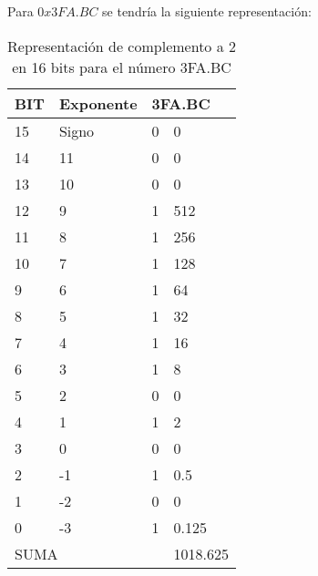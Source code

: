 \documentclass[stu, 12pt, letterpaper, donotrepeattitle, floatsintext, natbib]{apa7}
\begin{document}
Para $0x3FA.BC$ se tendría la siguiente representación:
\begin{table}[]
\caption{Representación de complemento a 2 en 16 bits para el número 3FA.BC}
\begin{tabular}{|llll|}
\hline
\multicolumn{1}{|l|}{BIT} & \multicolumn{1}{l|}{Exponente} & \multicolumn{2}{l|}{3FA.BC}       \\ \hline
\multicolumn{1}{|l|}{15}  & \multicolumn{1}{l|}{Signo}     & \multicolumn{1}{l|}{0} & 0        \\ \hline
\multicolumn{1}{|l|}{14}  & \multicolumn{1}{l|}{11}        & \multicolumn{1}{l|}{0} & 0        \\ \hline
\multicolumn{1}{|l|}{13}  & \multicolumn{1}{l|}{10}        & \multicolumn{1}{l|}{0} & 0        \\ \hline
\multicolumn{1}{|l|}{12}  & \multicolumn{1}{l|}{9}         & \multicolumn{1}{l|}{1} & 512      \\ \hline
\multicolumn{1}{|l|}{11}  & \multicolumn{1}{l|}{8}         & \multicolumn{1}{l|}{1} & 256      \\ \hline
\multicolumn{1}{|l|}{10}  & \multicolumn{1}{l|}{7}         & \multicolumn{1}{l|}{1} & 128      \\ \hline
\multicolumn{1}{|l|}{9}   & \multicolumn{1}{l|}{6}         & \multicolumn{1}{l|}{1} & 64       \\ \hline
\multicolumn{1}{|l|}{8}   & \multicolumn{1}{l|}{5}         & \multicolumn{1}{l|}{1} & 32       \\ \hline
\multicolumn{1}{|l|}{7}   & \multicolumn{1}{l|}{4}         & \multicolumn{1}{l|}{1} & 16       \\ \hline
\multicolumn{1}{|l|}{6}   & \multicolumn{1}{l|}{3}         & \multicolumn{1}{l|}{1} & 8        \\ \hline
\multicolumn{1}{|l|}{5}   & \multicolumn{1}{l|}{2}         & \multicolumn{1}{l|}{0} & 0        \\ \hline
\multicolumn{1}{|l|}{4}   & \multicolumn{1}{l|}{1}         & \multicolumn{1}{l|}{1} & 2        \\ \hline
\multicolumn{1}{|l|}{3}   & \multicolumn{1}{l|}{0}         & \multicolumn{1}{l|}{0} & 0        \\ \hline
\multicolumn{1}{|l|}{2}   & \multicolumn{1}{l|}{-1}        & \multicolumn{1}{l|}{1} & 0.5      \\ \hline
\multicolumn{1}{|l|}{1}   & \multicolumn{1}{l|}{-2}        & \multicolumn{1}{l|}{0} & 0        \\ \hline
\multicolumn{1}{|l|}{0}   & \multicolumn{1}{l|}{-3}        & \multicolumn{1}{l|}{1} & 0.125    \\ \hline
\multicolumn{3}{|l|}{SUMA}                                                          & 1018.625 \\ \hline
\end{tabular}
\end{table}
\end{document}
